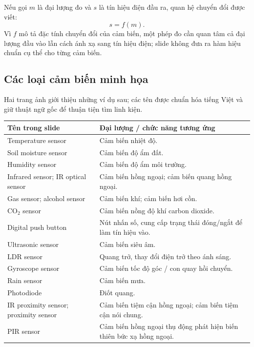 Nếu gọi \(m\) là đại lượng đo và \(s\) là tín hiệu điện đầu ra, quan hệ chuyển đổi được viết:
\begin{equation}\boxed{s=f(m).}\end{equation}
Vì \(f\) mô tả đặc tính chuyển đổi của cảm biến, một phép đo cần quan tâm cả đại lượng đầu vào lẫn cách ánh xạ sang tín hiệu điện; slide không đưa ra hàm hiệu chuẩn cụ thể cho từng cảm biến.
\subsection{Các loại cảm biến minh họa}
Hai trang ảnh giới thiệu những ví dụ sau; các tên được chuẩn hóa tiếng Việt và giữ thuật ngữ gốc để thuận tiện tìm linh kiện.
\begin{longtable}{p{.31\linewidth}p{.60\linewidth}}
\toprule\textbf{Tên trong slide} & \textbf{Đại lượng / chức năng tương ứng}\\\midrule\endhead
Temperature sensor & Cảm biến nhiệt độ.\\
Soil moisture sensor & Cảm biến độ ẩm đất.\\
Humidity sensor & Cảm biến độ ẩm môi trường.\\
Infrared sensor; IR optical sensor & Cảm biến hồng ngoại; cảm biến quang hồng ngoại.\\
Gas sensor; alcohol sensor & Cảm biến khí; cảm biến hơi cồn.\\
CO\(_2\) sensor & Cảm biến nồng độ khí carbon dioxide.\\
Digital push button & Nút nhấn số, cung cấp trạng thái đóng/ngắt để làm tín hiệu vào.\\
Ultrasonic sensor & Cảm biến siêu âm.\\
LDR sensor & Quang trở, thay đổi điện trở theo ánh sáng.\\
Gyroscope sensor & Cảm biến tốc độ góc / con quay hồi chuyển.\\
Rain sensor & Cảm biến mưa.\\
Photodiode & Điốt quang.\\
IR proximity sensor; proximity sensor & Cảm biến tiệm cận hồng ngoại; cảm biến tiệm cận nói chung.\\
PIR sensor & Cảm biến hồng ngoại thụ động phát hiện biến thiên bức xạ hồng ngoại.\\\bottomrule
\end{longtable}
